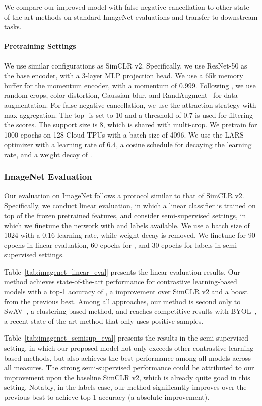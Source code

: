 \documentclass[10pt,twocolumn,letterpaper]{article}
\begin{document}
We compare our improved model with false negative cancellation to other state-of-the-art methods on standard ImageNet evaluations and transfer to downstream tasks.

\paragraph{Pretraining Settings} We use similar configurations as SimCLR v2. Specifically, we use ResNet-50 as the base encoder, with a 3-layer MLP projection head. We use a 65k memory buffer for the momentum encoder, with a momentum of 0.999. Following \citet{tian2020what}, we use random crops, color distortion, Gaussian blur, and RandAugment~\cite{cubuk2019randaugment} 
for data augmentation. For false negative cancellation, we use the attraction strategy with max aggregation. The top- is set to 10 and a threshold of 0.7 is used for filtering the scores. The support size is 8, which is shared with multi-crop. We pretrain for 1000 epochs on 128 Cloud TPUs with a batch size of 4096. We use the LARS optimizer with a learning rate of 6.4, a cosine schedule for decaying the learning rate, and a weight decay of .
\subsubsection{ImageNet Evaluation}

Our evaluation on ImageNet follows a protocol similar to that of SimCLR v2. Specifically, we conduct linear evaluation, in which a linear classifier is trained on top of the frozen pretrained features, and consider semi-supervised settings, in which we finetune the network with  and  labels available. We use a batch size of 1024 with a 0.16 learning rate, while weight decay is removed. We finetune for 90 epochs in linear evaluation, 60 epochs for , and 30 epochs for  labels in semi-supervised settings.

Table~\ref{tab:imagenet_linear_eval} presents the linear evaluation results. Our method achieves state-of-the-art performance for contrastive learning-based models with a top-1 accuracy of , a  improvement over SimCLR v2 and a  boost from the previous best. Among all approaches, our method is second only to SwAV~\cite{caron2020unsupervised}, a clustering-based method, and reaches competitive results with BYOL~\cite{grill2020bootstrap}, a recent state-of-the-art method that only uses positive samples.

Table~\ref{tab:imagenet_semisup_eval} presents the results in the semi-supervised setting, in which our proposed model not only exceeds other contrastive learning-based methods, but also achieves the best performance among all models across all measures. The strong semi-supervised performance could be attributed to our improvement upon the baseline SimCLR v2, which is already quite good in this setting. Notably, in the  labels case, our method significantly improves over the previous best to achieve  top-1 accuracy (a  absolute improvement).
\end{document}
